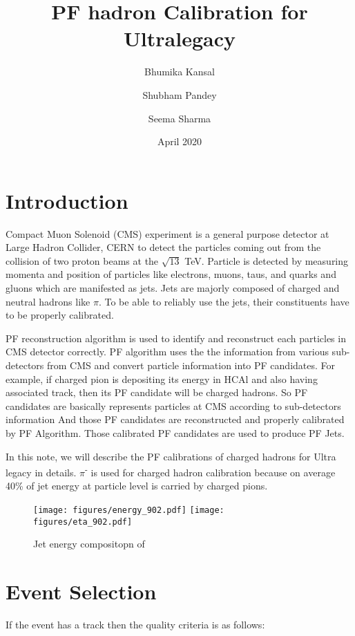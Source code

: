 \documentclass{article}
\title{PF hadron Calibration for Ultralegacy}
\author[1]{Bhumika Kansal }
\author[2]{Shubham Pandey}
\author[3]{Seema Sharma}
\affil[123]{IISER, Pune}
\date{April 2020}
\begin{document}
\maketitle

\section{Introduction}
\vspace*{0.5cm}
\par
\large
Compact Muon Solenoid (CMS) experiment is a general purpose detector at Large Hadron Collider, CERN to detect the particles coming out from the collision of two proton beams at the $\sqrt{13}$ TeV. Particle is detected by measuring momenta and position of particles like electrons, muons, taus, and quarks and gluons which are manifested as jets. Jets are majorly composed of charged and neutral hadrons like $\pi$. To be able to reliably use the jets, their constituents have to be properly calibrated.
\par
PF reconstruction algorithm is used to identify and reconstruct each particles in CMS detector correctly. PF algorithm uses the the information from various sub-detectors from CMS and convert particle information into PF candidates. For example, if charged pion is depositing its energy in HCAl and also having associated track, then its PF candidate will be charged hadrons. So PF candidates are basically represents particles at CMS according to sub-detectors information And those PF candidates are reconstructed and properly calibrated by PF Algorithm. Those calibrated PF candidates are used to produce PF Jets.
\par
In this note, we will describe the PF calibrations of charged hadrons for Ultra legacy in details. $\pi$\textsuperscript{-} is used for charged hadron calibration because on average 40\% of jet energy at particle level is carried by charged pions.

\begin{figure}[htbp]
\centering %
\texttt{[image: figures/energy\_902.pdf]}
\texttt{[image: figures/eta\_902.pdf]}
\caption{\label{fig:1} Jet energy compositopn of }
\end{figure}

\section{Event Selection}
\vspace*{0.5cm}
\par
\large
If the event has a track then the quality criteria is as follows:
\end{document}

